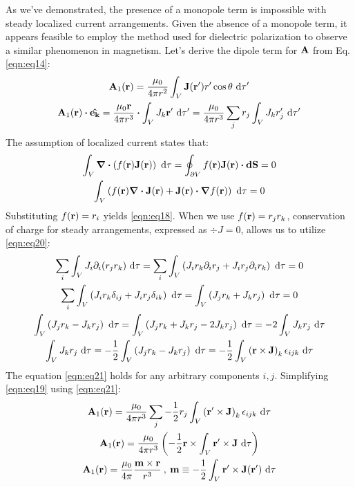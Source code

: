 \documentclass{article}
\numberwithin{equation}{section}
\begin{document}
As we've demonstrated, the presence of a monopole term is impossible with steady localized current arrangements. Given the absence of a monopole term, it appears feasible to employ the method used for dielectric polarization to observe a similar phenomenon in magnetism. Let's derive the dipole term for $\vb{A}$  from Eq. \eqref{eqn:eq14}:
%
\begin{gather}
	\vb{A}_1(\vb{r})=\frac{\mu_0}{4\pi r^2} \int_V \vb{J}(\vb{r'})r' \cos\theta \ \dd\tau'\nonumber\\\vb{A}_1(\vb{r})\vdot \vu{e_k}=\frac{\mu_0\vb{r}}{4\pi r^3}\vdot \int_V J_k \vb{r'} \ \dd\tau'=\frac{\mu_0}{4\pi r^3}\sum_j r_j\int_V J_k r'_j \ \dd\tau' \label{eqn:eq19}
\end{gather}
%
The assumption of localized current states that:
%
\begin{gather}
\int_V \div\left( f(\vb{r}) \vb{J}(\vb{r}) \right) \ \dd\tau=\oint_{\partial V} f(\vb{r})\vb{J}(\vb{r})\vdot\vb{dS}=0 \nonumber\\
\int_V \left( f(\vb{r}) \div\vb{J}(\vb{r})+\vb{J}(\vb{r})\vdot\grad f(\vb{r}) \right) \ \dd\tau=0 \label{eqn:eq20}
\end{gather}
%
Substituting $f(\vb{r})=r_i$ yields \eqref{eqn:eq18}. When we use $f(\vb{r})=r_j r_k$, conservation of charge for steady arrangements, expressed as $\div J = 0$, allows us to utilize \eqref{eqn:eq20}:
%
\begin{gather}
\sum_i\int_V  J_i\partial_i(r_jr_k)  \ \dd\tau =\sum_i \int_V \left(J_ir_k\partial_ir_j+J_ir_j\partial_ir_k \right) \ \dd\tau = 0\nonumber\\ \sum_i \int_V \left( J_i r_k \delta_{ij} + J_i r_j \delta_{ik} \right) \ \dd\tau=\int_V \left( J_j r_k + J_k r_j \right) \ \dd\tau=0\nonumber\\ \int_V \left( J_jr_k-J_kr_j \right)\ \dd\tau=\int_V \left( J_jr_k+J_kr_j - 2J_kr_j\right)\ \dd\tau=-2\int_V J_k r_j \ \dd\tau\nonumber\\ \int_V J_kr_j\ \dd\tau=-\frac{1}{2}\int_V \left(J_jr_k-J_kr_j\right) \ \dd\tau=-\frac{1}{2}\int_V \left( \vb{r}\times\vb{J}\right)_k\epsilon_{ijk}\ \dd\tau \label{eqn:eq21}
\end{gather}
%
The equation \eqref{eqn:eq21} holds for any arbitrary components $i,j$. Simplifying \eqref{eqn:eq19} using \eqref{eqn:eq21}\cite{book:925320}:
%
\begin{gather}
\vb{A}_1(\vb{r})=\frac{\mu_0}{4\pi r^3}\sum_j -\frac{1}{2} r_j \int_V \left(\vb{r'}\times\vb{J}\right)_k\epsilon_{ijk} \ \dd\tau \nonumber\\\vb{A}_1(\vb{r})=\frac{\mu_0}{4\pi r^3}\left(-\frac{1}{2} \vb{r}\times \int_V \vb{r'}\times\vb{J}\ \dd\tau\right)\nonumber\\ \vb{A}_1(\vb{r})=\frac{\mu_0}{4\pi } \frac{\vb{m}\times\vb{r}}{r^3}\:,\:\vb{m}\equiv-\frac{1}{2}\int_V\vb{r'}\times\vb{J}(\vb{r'}) \ \dd\tau \label{eqn:eq22}
\end{gather}
\end{document}
